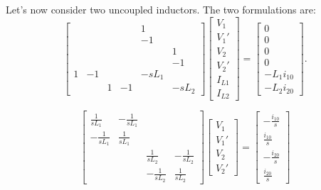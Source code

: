 \documentclass[a4paper, 12pt]{article}
\begin{document}
Let's now consider two uncoupled inductors.  The two formulations are:
%
\begin{equation}
  \begin{bmatrix}
     &  &  &    &  1 & \\
     &  &  &    & -1 & \\
     &  &  &    &    & 1\\
     &  &  &    &    & -1\\
1 & -1  &  &    & -sL_1 & \\
     &  & 1 & -1 &  & -sL_2
  \end{bmatrix}
  \begin{bmatrix}
    V_1 \\ V_1' \\ V_2 \\ V_2' \\ I_{L1} \\ I_{L2}
  \end{bmatrix}
=
\begin{bmatrix}
  0 \\ 0 \\ 0 \\ 0 \\ -L_1 i_{10} \\ -L_2 i_{20}
\end{bmatrix}.
\label{eqn:L1L2_stamp1}
\end{equation}


\begin{equation}
  \begin{bmatrix}
    \frac{1}{sL_1} & -\frac{1}{sL_1} &   & \\
   -\frac{1}{sL_1} & \frac{1}{sL_1}  &   & \\
   & &  \frac{1}{sL_2} & -\frac{1}{sL_2}   \\
   & & -\frac{1}{sL_2} & \frac{1}{sL_2}
  \end{bmatrix}
  \begin{bmatrix}
    V_1 \\ V_1' \\ V_2 \\ V_2'
  \end{bmatrix}
=
\begin{bmatrix}
  -\frac{i_{10}}{s} \\ \frac{i_{10}}{s} \\
  -\frac{i_{20}}{s} \\ \frac{i_{20}}{s}
\end{bmatrix}
\label{eqn:L1L2_stamp2}
\end{equation}
\end{document}
